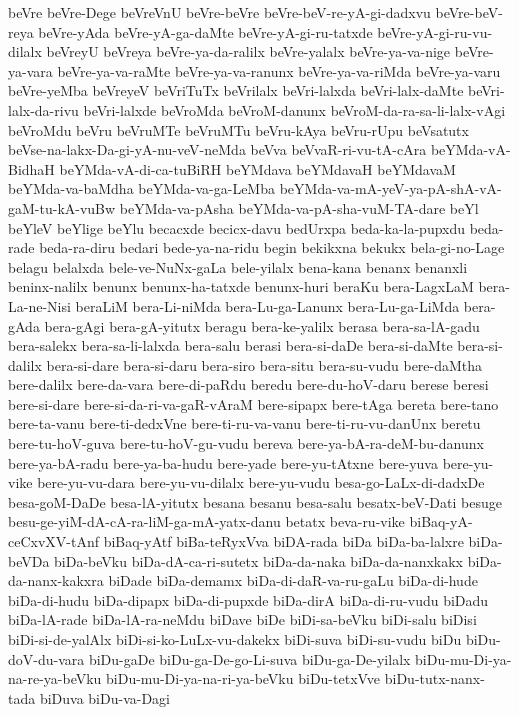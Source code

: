 {beVre
beVre-Dege
beVreVnU
beVre-beVre
beVre-beV-re-yA-gi-dadxvu
beVre-beV-reya
beVre-yAda
beVre-yA-ga-daMte
beVre-yA-gi-ru-tatxde
beVre-yA-gi-ru-vu-dilalx
beVreyU
beVreya
beVre-ya-da-ralilx
beVre-yalalx
beVre-ya-va-nige
beVre-ya-vara
beVre-ya-va-raMte
beVre-ya-va-ranunx
beVre-ya-va-riMda
beVre-ya-varu
beVre-yeMba
beVreyeV
beVriTuTx
beVrilalx
beVri-lalxda
beVri-lalx-daMte
beVri-lalx-da-rivu
beVri-lalxde
beVroMda
beVroM-danunx
beVroM-da-ra-sa-li-lalx-vAgi
beVroMdu
beVru
beVruMTe
beVruMTu
beVru-kAya
beVru-rUpu
beVsatutx
beVse-na-lakx-Da-gi-yA-nu-veV-neMda
beVva
beVvaR-ri-vu-tA-cAra
beYMda-vA-BidhaH
beYMda-vA-di-ca-tuBiRH
beYMdava
beYMdavaH
beYMdavaM
beYMda-va-baMdha
beYMda-va-ga-LeMba
beYMda-va-mA-yeV-ya-pA-shA-vA-gaM-tu-kA-vuBw
beYMda-va-pAsha
beYMda-va-pA-sha-vuM-TA-dare
beYl
beYleV
beYlige
beYlu
becacxde
becicx-davu
bedUrxpa
beda-ka-la-pupxdu
beda-rade
beda-ra-diru
bedari
bede-ya-na-ridu
begin
bekikxna
bekukx
bela-gi-no-Lage
belagu
belalxda
bele-ve-NuNx-gaLa
bele-yilalx
bena-kana
benanx
benanxli
beninx-nalilx
benunx
benunx-ha-tatxde
benunx-huri
beraKu
bera-LagxLaM
bera-La-ne-Nisi
beraLiM
bera-Li-niMda
bera-Lu-ga-Lanunx
bera-Lu-ga-LiMda
bera-gAda
bera-gAgi
bera-gA-yitutx
beragu
bera-ke-yalilx
berasa
bera-sa-lA-gadu
bera-salekx
bera-sa-li-lalxda
bera-salu
berasi
bera-si-daDe
bera-si-daMte
bera-si-dalilx
bera-si-dare
bera-si-daru
bera-siro
bera-situ
bera-su-vudu
bere-daMtha
bere-dalilx
bere-da-vara
bere-di-paRdu
beredu
bere-du-hoV-daru
berese
beresi
bere-si-dare
bere-si-da-ri-va-gaR-vAraM
bere-sipapx
bere-tAga
bereta
bere-tano
bere-ta-vanu
bere-ti-dedxVne
bere-ti-ru-va-vanu
bere-ti-ru-vu-danUnx
beretu
bere-tu-hoV-guva
bere-tu-hoV-gu-vudu
bereva
bere-ya-bA-ra-deM-bu-danunx
bere-ya-bA-radu
bere-ya-ba-hudu
bere-yade
bere-yu-tAtxne
bere-yuva
bere-yu-vike
bere-yu-vu-dara
bere-yu-vu-dilalx
bere-yu-vudu
besa-go-LaLx-di-dadxDe
besa-goM-DaDe
besa-lA-yitutx
besana
besanu
besa-salu
besatx-beV-Dati
besuge
besu-ge-yiM-dA-cA-ra-liM-ga-mA-yatx-danu
betatx
beva-ru-vike
biBaq-yA-ceCxvXV-tAnf
biBaq-yAtf
biBa-teRyxVva
biDA-rada
biDa
biDa-ba-lalxre
biDa-beVDa
biDa-beVku
biDa-dA-ca-ri-sutetx
biDa-da-naka
biDa-da-nanxkakx
biDa-da-nanx-kakxra
biDade
biDa-demamx
biDa-di-daR-va-ru-gaLu
biDa-di-hude
biDa-di-hudu
biDa-dipapx
biDa-di-pupxde
biDa-dirA
biDa-di-ru-vudu
biDadu
biDa-lA-rade
biDa-lA-ra-neMdu
biDave
biDe
biDi-sa-beVku
biDi-salu
biDisi
biDi-si-de-yalAlx
biDi-si-ko-LuLx-vu-dakekx
biDi-suva
biDi-su-vudu
biDu
biDu-doV-du-vara
biDu-gaDe
biDu-ga-De-go-Li-suva
biDu-ga-De-yilalx
biDu-mu-Di-ya-na-re-ya-beVku
biDu-mu-Di-ya-na-ri-ya-beVku
biDu-tetxVve
biDu-tutx-nanx-tada
biDuva
biDu-va-Dagi
}
